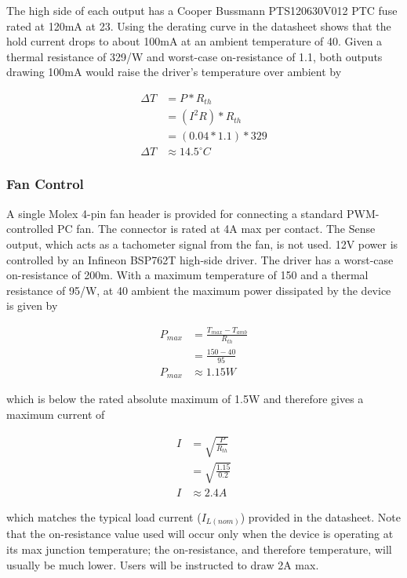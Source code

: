 \documentclass{article}
\newcommand{\degree}{\ensuremath{^{\circ}}}
\begin{document}
The high side of each output has a Cooper Bussmann PTS120630V012 PTC fuse rated at 120mA at
23\textcelsius{}.  Using the derating curve in the datasheet shows that the hold current drops to
about 100mA at an ambient temperature of 40\textcelsius{}.  Given a thermal resistance of
329\textcelsius{}/W and worst-case on-resistance of 1.1\textOmega, both outputs drawing 100mA would
raise the driver's temperature over ambient by

\begin{align*}
    \Delta T &= P * R_{th} \\
    &= (I^2R) * R_{th} \\
    &= (0.04 * 1.1) * 329 \\
    \Delta T &\approx 14.5\degree C
\end{align*}

\subsubsection{Fan Control} \label{sssec:FanControl}
A single Molex 4-pin fan header is provided for connecting a standard PWM-controlled PC fan.  The
connector is rated at 4A max per contact.  The Sense output, which acts as a tachometer signal from
the fan, is not used.  12V power is controlled by an Infineon BSP762T high-side driver.  The driver
has a worst-case on-resistance of 200m\textOmega.  With a maximum temperature of 150\textcelsius{}
and a thermal resistance of 95\textcelsius{}/W, at 40\textcelsius{} ambient the maximum power
dissipated by the device is given by

\begin{align*}
    P_{max} &= \frac{T_{max}-T_{amb}}{R_{th}} \\
    &= \frac{150 - 40}{95} \\
    P_{max} &\approx 1.15W
\end{align*}

which is below the rated absolute maximum of 1.5W and therefore gives a maximum current of

\begin{align*}
    I &= \sqrt{\frac{P}{R_{th}}} \\
    &= \sqrt{\frac{1.15}{0.2}} \\
    I &\approx 2.4A
\end{align*}

which matches the typical load current ($I_{L(nom)}$) provided in the datasheet.  Note that the
on-resistance value used will occur only when the device is operating at its max junction
temperature; the on-resistance, and therefore temperature, will usually be much lower.  Users will
be instructed to draw 2A max.
\end{document}
